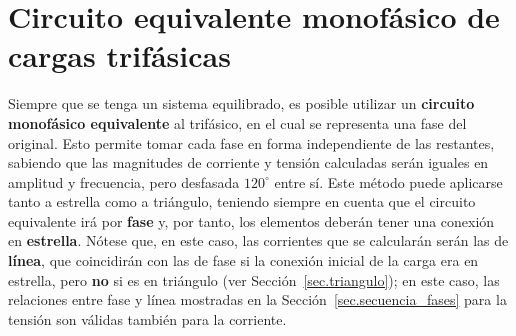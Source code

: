 \documentclass[11pt]{book} %
\begin{document}
	\section{Circuito equivalente monofásico de cargas trifásicas}\label{sec.c_eq_mon}
	 Siempre que se tenga un sistema equilibrado, es posible utilizar un \textbf{circuito monofásico equivalente} al trifásico, en el cual se representa una fase del original. Esto permite tomar cada fase en forma independiente de las restantes, sabiendo que las magnitudes de corriente y tensión calculadas serán iguales en amplitud y frecuencia, pero desfasada $120^\circ$ entre sí. Este método puede aplicarse tanto a estrella como a triángulo, teniendo siempre en cuenta que el circuito equivalente irá por \textbf{fase} y, por tanto, los elementos deberán tener una conexión en \textbf{estrella}. Nótese que, en este caso, las corrientes que se calcularán serán las de \textbf{línea}, que coincidirán con las de fase si la conexión inicial de la carga era en estrella, pero \textbf{no} si es en triángulo (ver Sección~\ref{sec.triangulo}); en este caso, las relaciones entre fase y línea mostradas en la Sección~\ref{sec.secuencia_fases} para la tensión son válidas también para la corriente.
	 
\end{document}
